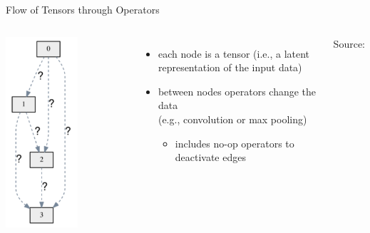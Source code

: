 \begin{frame}[c]{Flow of Tensors through Operators}


\begin{columns}

\centering
\includegraphics[width=0.6\textwidth]{images/nas_darts_space_idea.png}


\begin{itemize}
	\item each node is a tensor (i.e., a latent representation of the input data)
	\item between nodes operators change the data\\ (e.g., convolution or max pooling)
	\begin{itemize}  
		\item includes no-op operators to deactivate edges
	\end{itemize}
\end{itemize}


\begin{flushright}
	Source: 
\end{flushright}

\end{columns}

\end{frame}

